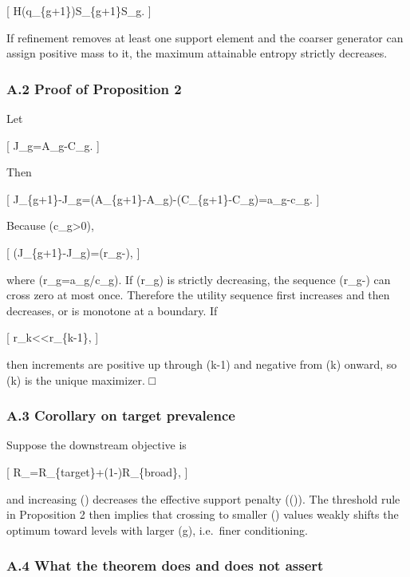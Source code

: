 \documentclass[
]{article}
\begin{document}
{[}
H(q\_\{g+1\})\le \log\textbar S\_\{g+1\}\textbar{}\le \log\textbar S\_g\textbar.
{]}

If refinement removes at least one support element and the coarser
generator can assign positive mass to it, the maximum attainable entropy
strictly decreases.

\subsubsection{A.2 Proof of Proposition
2}\label{a.2-proof-of-proposition-2}

Let

{[} J\_g=A\_g-\lambda C\_g. {]}

Then

{[}
J\_\{g+1\}-J\_g=(A\_\{g+1\}-A\_g)-\lambda(C\_\{g+1\}-C\_g)=a\_g-\lambda c\_g.
{]}

Because (c\_g\textgreater0),

{[}
(J\_\{g+1\}-J\_g)=(r\_g-\lambda),
{]}

where (r\_g=a\_g/c\_g). If (r\_g) is strictly decreasing, the sequence
(r\_g-\lambda) can cross zero at most once. Therefore the utility
sequence first increases and then decreases, or is monotone at a
boundary. If

{[} r\_k\textless{}\lambda\textless r\_\{k-1\}, {]}

then increments are positive up through (k-1) and negative from (k)
onward, so (k) is the unique maximizer. □

\subsubsection{A.3 Corollary on target
prevalence}\label{a.3-corollary-on-target-prevalence}

Suppose the downstream objective is

{[} R\_\rho=\rho R\_\{target\}+(1-\rho)R\_\{broad\}, {]}

and increasing (\rho) decreases the effective support penalty
(\lambda(\rho)). The threshold rule in Proposition 2 then implies that
crossing to smaller (\lambda) values weakly shifts the optimum toward
levels with larger (g), i.e.~finer conditioning.

\subsubsection{A.4 What the theorem does and does not
assert}\label{a.4-what-the-theorem-does-and-does-not-assert}
\end{document}
